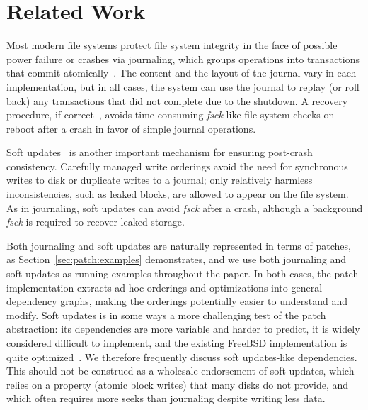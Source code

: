 \section{Related Work}
\label{sec:related}


Most modern file systems protect file system integrity in the face of
possible power failure or crashes via journaling, which groups
operations into transactions that commit
atomically~\cite{seltzer00journaling}.
The content and the layout of the
journal vary in each implementation, but in all cases, the system can use the
journal to replay (or roll back) any transactions that did not complete due to
the shutdown. A recovery procedure, if correct~\cite{yang04using}, 
avoids time-consuming
\emph{fsck}-like file system
checks on reboot after a crash in favor of simple journal operations.

Soft updates~\cite{ganger00soft} is another important mechanism for
ensuring post-crash consistency. Carefully managed write orderings
avoid the need for synchronous writes to disk or duplicate writes to
a journal; only relatively harmless inconsistencies, such as leaked blocks,
are allowed to appear on the file system. As in journaling, soft updates
can avoid \emph{fsck} after a crash, although a background \emph{fsck} is
required to recover leaked storage.

Both journaling and soft updates are naturally represented in terms of
patches, as Section~\ref{sec:patch:examples} demonstrates, and we use both
journaling and soft updates as running examples throughout the paper.
%
In both cases, the patch implementation extracts ad hoc orderings and
optimizations into general dependency graphs, making the orderings
potentially easier to understand and modify.
%
Soft updates is in some ways a more challenging test of the patch
abstraction: its dependencies are more variable and harder to predict,
it is widely considered difficult to implement, and the existing FreeBSD
implementation is quite optimized~\cite{mckusick99soft}.
%
We therefore frequently discuss soft updates-like
dependencies.
%
This should not be construed as a wholesale endorsement of soft updates,
which relies on a property (atomic block writes) that many disks do not
provide, and which often requires more seeks than journaling
despite writing less data.

